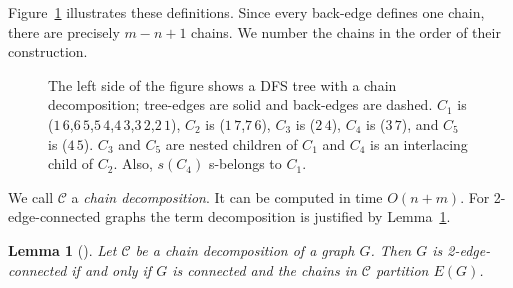 \documentclass[paper=a4]{scrartcl}
\newtheorem{lemma}{Lemma}
\newcommand{\C}{\ensuremath{\mathcal{C}}}
\newcommand{\edge}[2]{\ensuremath{#1\,#2}}
\begin{document}
Figure~\ref{fig:chains} illustrates these definitions. Since every back-edge defines one chain, there are precisely $m-n+1$ chains. We number the chains in the order of their construction.
\begin{figure}
\centering
\begin{minipage}{0.4\linewidth}
\end{minipage}
\hfill
\begin{minipage}{0.4\linewidth}
\end{minipage}
\caption{
The left side of the figure shows a DFS tree with a chain decomposition; tree-edges are solid and back-edges are dashed. $C_1$ is (\edge{1}{6},\edge{6}{5},\edge{5}{4},\edge{4}{3},\edge{3}{2},\edge{2}{1}), $C_2$ is (\edge{1}{7},\edge{7}{6}), $C_3$ is (\edge{2}{4}), $C_4$ is (\edge{3}{7}), and $C_5$ is (\edge{4}{5}). $C_3$ and $C_5$ are nested children of $C_1$ and $C_4$ is an interlacing child of $C_2$. Also, $s(C_4)$ s-belongs to $C_1$.} \label{fig:chains}
\end{figure}

We call $\C$ a \emph{chain decomposition}. It can be computed in time $O(n+m)$. For 2-edge-connected graphs the term decomposition is justified by Lemma~\ref{lem:2connectivity}.

\begin{lemma}[\cite{Schmidt2013a}]\label{lem:2connectivity}
Let $\C$ be a chain decomposition of a graph $G$. Then $G$ is 2-edge-connected if and only if $G$ is connected and the chains in $\C$ partition $E(G)$.
\end{lemma}
\end{document}
